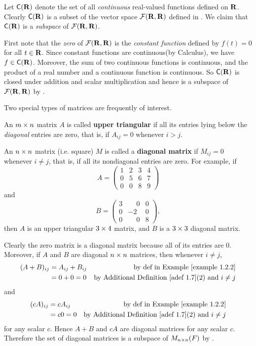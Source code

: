 \begin{example} \label{example 1.3.2}
Let \(\textsf{C}(\mathbf{R})\) denote the set of all \emph{continuous} real-valued functions defined on \(\mathbf{R}\).
Clearly \(\textsf{C}(\mathbf{R})\) is a subset of the vector space \(\mathcal{F}(\mathbf{R}, \mathbf{R})\) defined in .
We claim that \(\textsf{C}(\mathbf{R})\) is a \emph{subspace} of \(\mathcal{F}(\mathbf{R}, \mathbf{R})\).

First note that the \emph{zero} of \(\mathcal{F}(\mathbf{R}, \mathbf{R})\) is the \emph{constant function} defined by \(f(t) = 0\) for all \(t \in \mathbf{R}\).
Since constant functions are continuous(by Calculus), we have \(f \in \textsf{C}(\mathbf{R})\).
Moreover, the sum of two continuous functions is continuous, and the product of a real number and a continuous function is continuous.
So \(\textsf{C}(\mathbf{R})\) is closed under addition and scalar multiplication and hence is a subspace of \(\mathcal{F}(\mathbf{R}, \mathbf{R})\) by .
\end{example}

\begin{additional definition} \label{adef 1.7}
Two special types of matrices are frequently of interest.

 An \(m \times n\) matrix \(A\) is called \textbf{upper triangular} if all its entries lying below the \emph{diagonal} entries are zero,
that is, if \(A_{ij} = 0\) whenever \(i > j\).

 An \(n \times n\) matrix (i.e. square) \(M\) is called a \textbf{diagonal matrix} if \(M_{ij} = 0\) whenever \(i \ne j\),
that is, if all its nondiagonal entries are zero.
For example, if
\[
A = 
\begin{pmatrix}
1 & 2 & 3 & 4 \\
0 & 5 & 6 & 7 \\
0 & 0 & 8 & 9
\end{pmatrix}
\]
and
\[
B =
\begin{pmatrix}
3 & \phantom{-}0 & 0 \\
0 &           -2 & 0 \\
0 & \phantom{-}0 & 8
\end{pmatrix},
\]
then \(A\) is an upper triangular \(3 \times 4\) matrix, and \(B\) is a \(3 \times 3\) diagonal matrix.
\end{additional definition}

\begin{example} \label{example 1.3.3}
Clearly the zero matrix is a diagonal matrix because all of its entries are \(0\).
Moreover, if \(A\) and \(B\) are diagonal \(n \times n\) matrices, then whenever \(i \ne j\),
\begin{align*}
    (A + B)_{ij} & = A_{ij} + B_{ij} & \text{by def in \EXAMPLE{1.2.2}} \\
                 & = 0 + 0 = 0 & \text{by \ADEF{1.7}(2) and \(i \ne j\)}
\end{align*}
and
\begin{align*}
    (cA)_{ij} & = cA_{ij} & \text{by def in \EXAMPLE{1.2.2}} \\
              & = c 0 = 0 & \text{by \ADEF{1.7}(2) and \(i \ne j\)}
\end{align*}
for any scalar \(c\).
Hence \(A + B\) and \(cA\) are diagonal matrices for any scalar \(c\).
Therefore the set of diagonal matrices is a subspace of \(M_{n \times n}(F)\) by .
\end{example}

